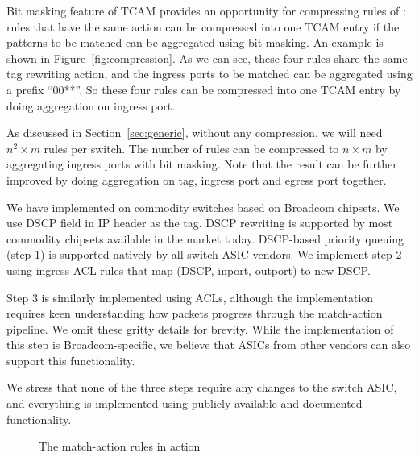 Bit masking feature of TCAM provides an opportunity for compressing rules of
\sysname{}: rules that have the same action can be compressed into one TCAM
entry if the patterns to be matched can be aggregated using bit masking. An
example is shown in Figure~\ref{fig:compression}. As we can see, these four
rules share the same tag rewriting action, and the ingress ports to be matched
can be aggregated using a prefix ``00**''. So these four rules can be compressed
into one TCAM entry by doing aggregation on ingress port.

As discussed in Section~\ref{sec:generic}, without any compression, we will need
$n^2\times m$ rules per switch. The number of rules can be compressed to
$n\times m$ by aggregating ingress ports with bit masking. Note that the result
can be further improved by doing aggregation on tag, ingress port and egress
port together. 

We have implemented \sysname{} on commodity switches based on Broadcom chipsets.
We use DSCP field in IP header as the tag. DSCP rewriting is supported by most
commodity chipsets available in the market today. DSCP-based priority queuing
(step 1) is supported natively by all switch ASIC vendors. We implement step 2
using ingress ACL rules that map (DSCP, inport, outport) to new DSCP. 

Step 3 is similarly implemented using ACLs, although the implementation requires
keen understanding how packets progress through the match-action pipeline. We
omit these gritty details for brevity. While the implementation of this step is
Broadcom-specific, we believe that ASICs from other vendors can also support
this functionality.

We stress that none of the three steps require any changes to the switch ASIC,
and everything is implemented using publicly available and documented
functionality.

\begin{figure}[t]
	\centering
	
	
	\caption{The match-action rules in action}\label{fig:tagger_demon}
\end{figure}


